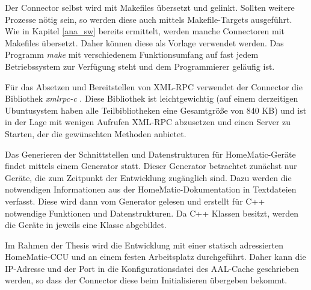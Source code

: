 Der Connector selbst wird mit Makefiles übersetzt und gelinkt.
Sollten weitere Prozesse nötig sein, so werden diese auch mittels Makefile-Targets
ausgeführt.
Wie in Kapitel \ref{ana_sw} bereits ermittelt, werden manche Connectoren mit Makefiles
übersetzt.
Daher können diese als Vorlage verwendet werden.
Das Programm \emph{make} mit verschiedenem Funktionsumfang auf fast jedem Betriebssystem
zur Verfügung steht und dem Programmierer geläufig ist.

Für das Absetzen und Bereitstellen von XML-RPC verwendet der Connector die Bibliothek
\emph{xmlrpc-c} \cite{xmlrpc-c}.
Diese Bibliothek ist leichtgewichtig (auf einem derzeitigen Ubuntusystem haben alle Teilbibliotheken
eine Gesamtgröße von 840 KB) und ist in der Lage mit wenigen Aufrufen XML-RPC abzusetzen
und einen Server zu Starten, der die gewünschten Methoden anbietet.

Das Generieren der Schnittstellen und Datenstrukturen für HomeMatic-Geräte findet mittels
einem Generator statt.
Dieser Generator betrachtet zunächst nur Geräte, die zum Zeitpunkt der Entwicklung
zugänglich sind.
Dazu werden die notwendigen Informationen aus der HomeMatic-Dokumentation \cite{hmscript2,hmscript4}
in Textdateien verfasst.
Diese wird dann vom Generator gelesen und erstellt für C++ notwendige Funktionen und
Datenstrukturen.
Da C++ Klassen besitzt, werden die Geräte in jeweils eine Klasse abgebildet.

Im Rahmen der Thesis wird die Entwicklung mit einer statisch adressierten HomeMatic-CCU
und an einem festen Arbeitsplatz durchgeführt.
Daher kann die IP-Adresse und der Port in die Konfigurationsdatei des AAL-Cache geschrieben werden,
so dass der Connector diese beim Initialisieren übergeben bekommt.


